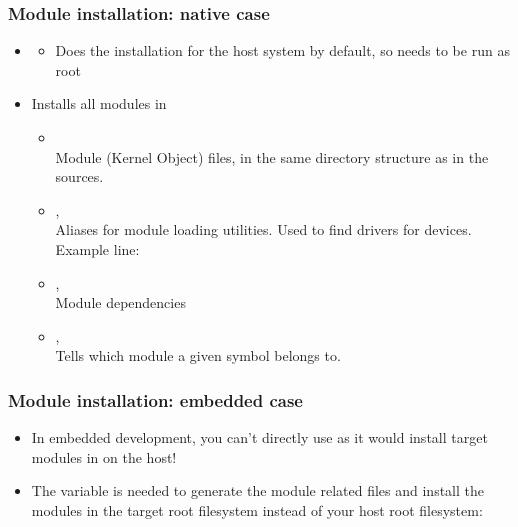 \begin{frame}
  \frametitle{Module installation: native case}
  \begin{itemize}
  \item {}
    \begin{itemize}
    \item Does the installation for the host system by default, so
      needs to be run as root
    \end{itemize}
  \item Installs all modules in 
    \begin{itemize}
    \item {}\\
      Module  (Kernel Object) files, in the same directory
      structure as in the sources.
    \item {}, \\
      Aliases for module loading utilities. Used to find drivers for
      devices. Example line:\\
    \item {}, \\
      Module dependencies
    \item {}, \\
      Tells which module a given symbol belongs to.
    \end{itemize}
  \end{itemize}
\end{frame}

\begin{frame}
  \frametitle{Module installation: embedded case}
  \begin{itemize}
  \item In embedded development, you can't directly use
     as it would install target modules
    in  on the host!
  \item The  variable is needed to generate
    the module related files and install the modules in the target
    root filesystem instead of your host root filesystem:\\
  \end{itemize}
\end{frame}

